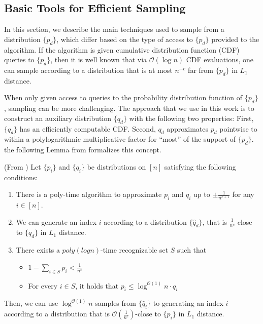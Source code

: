 






\subsection{Basic Tools for Efficient Sampling}
\label{sec:basic_tools_for_efficient_sampling}
In this section, we describe the main techniques used to sample from a distribution $\{ p_d\}$,
which differ based on the type of access to $\{p_d\}$ provided to the algorithm.
If the algorithm is given cumulative distribution function (CDF) queries to $\{p_d\}$,
then it is well known that via $\mathcal O(\log n)$ CDF evaluations, one can sample according
to a distribution that is at most $n^{-c}$ far from $\{p_d\}$ in $L_1$ distance.

When only given access to queries to the probability distribution function of $\{p_d\}$, sampling can be more challenging.
The approach that we use in this work is to construct an auxiliary distribution $\{q_d\}$ with the following two properties:
First, $\{ q_d\}$ has an efficiently computable CDF.
Second, $q_d$ approximates $p_d$ pointwise to within a polylogarithmic multiplicative factor for ``most'' of the support of $\{ p_d\}$.
the following Lemma from \cite{huge} formalizes this concept. %
\begin{lemma}
\label{lem:rejection_sampling} (From \cite{huge})
Let $\{p_i\}$ and $\{q_i\}$ be distributions on $[n]$ satisfying the following conditions:
\begin{enumerate}
\item There is a poly-time algorithm to approximate $p_i$ and $q_i$ up to $\pm \frac{1}{n^{c+1}}$ for any $i\in [n]$.
    \item We can generate an index $i$ according to a distribution $\{\hat q_d\}$, that is $ \frac{1}{n^c}$ close to $\{q_d\}$ in $L_1$ distance.
    \item There exists a $poly(log n)$-time recognizable set $S$ such that
    \begin{itemize}
        \item $1-\sum\limits_{i\in S} p_i < \frac 1{n^c}$
        \item For every $i\in S$, it holds that $p_i\le \log^{\mathcal{O}(1)} n\cdot q_i$
    \end{itemize}
\end{enumerate}
Then, we can use $\log^{\mathcal O(1)}n$ samples from $\{\hat q_i\}$ to generating an index $i$
according to a distribution that is $ \mathcal O\left(\frac{1}{n^c}\right)$-close to $\{p_i\}$ in $L_1$ distance.
\end{lemma}
